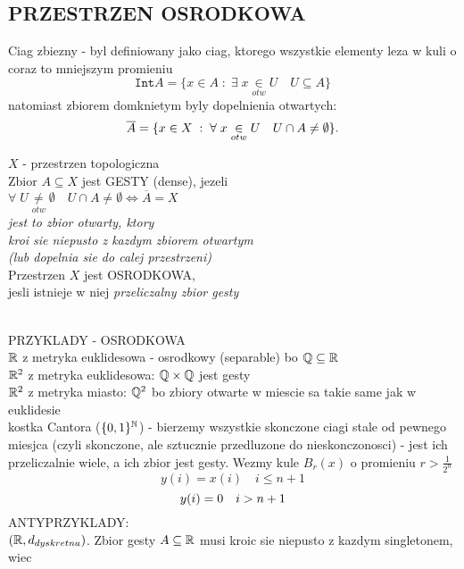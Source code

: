 \documentclass{article}
\begin{document}
\subsection*{PRZESTRZEN OSRODKOWA}\bigskip
    Ciag zbiezny - byl definiowany jako ciag, ktorego wszystkie elementy leza w kuli o coraz to mniejszym promieniu\\
    $$\texttt{Int}A= \{x\in A\;:\;\exists\;x\underset{otw}\in U\quad U\subseteq A\}$$
    natomiast zbiorem domknietym byly dopelnienia otwartych:
    $$\overline{A}=\{x\in X\;:\;\forall\;x\underset{otw}\in U\quad U\cap A\neq \emptyset\}.\bigskip$$
    \bigskip
    \begin{center}\large
        $X$ - przestrzen topologiczna\medskip\\
        Zbior $A\subseteq X$ jest {\color{def}GESTY} (dense), jezeli\smallskip\\
        $\forall\; U\underset{otw}\neq\emptyset\quad U\cap A\neq \emptyset\iff \overline{A}=X$\medskip\normalsize\\
        \emph{jest to zbior otwarty, ktory \\{\color{acc}kroi sie niepusto z kazdym zbiorem otwartym} \\(lub dopelnia sie do calej przestrzeni)}\bigskip\large\\
        Przestrzen $X$ jest {\color{def}OSRODKOWA}, \\jesli istnieje w niej \emph{\color{emp}przeliczalny zbior gesty}
    \end{center}\bigskip
    \bigskip\\
    {\large\color{emp}PRZYKLADY} - OSRODKOWA\medskip\\
    \indent$\mathbb{R}$ z metryka euklidesowa - osrodkowy (separable) bo \indent$\mathbb{Q}\subseteq \mathbb{R}$\medskip\\
    \indent$\mathbb{R}^2$ z metryka euklidesowa: $\mathbb{Q}\times \mathbb{Q}$ jest gesty\medskip\\
    \indent$\mathbb{R}^2$ z metryka miasto: $\mathbb{Q}^2$ bo zbiory otwarte w miescie sa takie same jak w euklidesie\medskip\\
    \indent kostka Cantora ($\{0,1\}^{\mathbb{N}}$) - bierzemy wszystkie skonczone ciagi stale od pewnego miesjca (czyli skonczone, ale sztucznie przedluzone do nieskonczonosci) - jest ich przeliczalnie wiele, a ich zbior jest gesty. Wezmy kule $B_r(x)$ o promieniu $r>\frac1{2^n}$
    $$y(i)=x(i)\quad i\leq n+1$$
    $$y(i)=0 \quad i>n+1\bigskip$$
    {\large\color{emp}ANTYPRZYKLADY}: \medskip\\
    \indent$(\mathbb{R}, d_{dyskretna})$. Zbior gesty $A\subseteq \mathbb{R}$ musi kroic sie niepusto z kazdym singletonem, wiec
\end{document}
